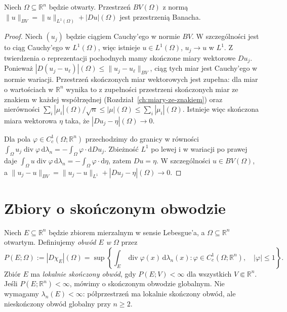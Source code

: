 \begin{twierdzenie}
\label{thm:BV-banach-29}
Niech $\Omega\subseteq\mathbb R^n$ będzie otwarty.
Przestrzeń $BV(\Omega)$ z normą
$\|u\|_{BV}=\|u\|_{L^1(\Omega)}+|Du|(\Omega)$
jest przestrzenią Banacha.
\end{twierdzenie}
\begin{proof}
Niech $(u_j)$ będzie ciągiem Cauchy'ego w normie
$BV$. W szczególności jest to ciąg Cauchy'ego w
$L^1(\Omega)$, więc istnieje $u\in L^1(\Omega)$,
$u_j\to u$ w $L^1$. Z twierdzenia o reprezentacji
pochodnych mamy skończone miary wektorowe $Du_j$.
Ponieważ
$|D(u_j-u_\ell)|(\Omega)\le\|u_j-u_\ell\|_{BV}$,
ciąg tych miar jest Cauchy'ego w normie wariacji.
Przestrzeń skończonych miar wektorowych jest zupełna:
dla miar o wartościach w $\mathbb R^n$ wynika to z
zupełności przestrzeni skończonych miar ze znakiem
w każdej współrzędnej (Rozdział~\ref{ch:miary-ze-znakiem})
oraz nierówności
$\sum_i|\mu_i|(\Omega)/\sqrt n\le|\mu|(\Omega)
\le\sum_i|\mu_i|(\Omega)$.
Istnieje więc skończona miara wektorowa $\eta$
taka, że $|Du_j-\eta|(\Omega)\to0$.

Dla pola $\varphi\in C_c^1(\Omega;\mathbb R^n)$
przechodzimy do granicy w równości
$\int_\Omega u_j\operatorname{div}\varphi\,\mathrm d\lambda_n
=-\int_\Omega\varphi\cdot\mathrm dDu_j$.
Zbieżność $L^1$ po lewej i w wariacji po prawej daje
$\int_\Omega u\operatorname{div}\varphi\,\mathrm d\lambda_n
=-\int_\Omega\varphi\cdot\mathrm d\eta$, zatem $Du=\eta$.
W szczególności $u\in BV(\Omega)$, a
$\|u_j-u\|_{BV}=\|u_j-u\|_{L^1}+|Du_j-\eta|(\Omega)\to0$.
\end{proof}

\section{Zbiory o skończonym obwodzie}
\begin{definicja}
\label{def:finite-perimeter-29}
Niech $E\subseteq\mathbb R^n$ będzie zbiorem mierzalnym
w sensie Lebesgue'a, a $\Omega\subseteq\mathbb R^n$ otwartym.
Definiujemy \emph{obwód $E$ w $\Omega$} przez
\[
 P(E;\Omega):=|D\chi_E|(\Omega)
 =\sup\left\{\int_E\operatorname{div}\varphi(x)
 \,\mathrm d\lambda_n(x):
 \varphi\in C_c^1(\Omega;\mathbb R^n),\quad|\varphi|\le1
 \right\}.
\]
Zbiór $E$ ma \emph{lokalnie skończony obwód},
gdy $P(E;V)<\infty$ dla wszystkich $V\Subset\mathbb R^n$.
Jeśli $P(E;\mathbb R^n)<\infty$, mówimy o skończonym
obwodzie globalnym. Nie wymagamy $\lambda_n(E)<\infty$:
półprzestrzeń ma lokalnie skończony obwód, ale
nieskończony obwód globalny przy $n\ge2$.
\end{definicja}

